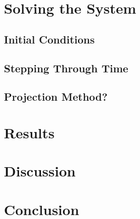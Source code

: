 \documentclass[twocolumn,12pth]{article}
\begin{document}
\section{Solving the System}

\subsection{Initial Conditions}

\subsection{Stepping Through Time}

\subsection{Projection Method?}

\section{Results}

\section{Discussion}

\section{Conclusion}


\nocite{*}

\end{document}
